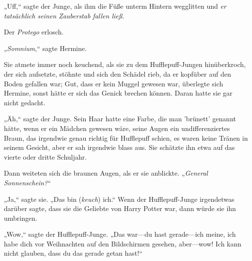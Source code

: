 „Uff,“ sagte der Junge, als ihm die Füße unterm Hintern wegglitten und \emph{er tatsächlich seinen Zauberstab fallen ließ}.

Der \emph{Protego} erlosch.

„\emph{Somnium},“ sagte Hermine.

Sie atmete immer noch keuchend, als sie zu dem Hufflepuff-Jungen hinüberkroch, der sich aufsetzte, stöhnte und sich den Schädel rieb, da er kopfüber auf den Boden gefallen war; Gut, dass er kein Muggel gewesen war, überlegte sich Hermine, sonst hätte er sich das Genick brechen können. Daran hatte sie gar nicht gedacht.

„Äh,“ sagte der Junge. Sein Haar hatte eine Farbe, die man 'brünett' genannt hätte, wenn er ein Mädchen gewesen wäre, seine Augen ein undifferenziertes Braun, das irgendwie genau richtig für Hufflepuff schien, es waren keine Tränen in seinem Gesicht, aber er sah irgendwie blass aus. Sie schätzte ihn etwa auf das vierte oder dritte Schuljahr.

Dann weiteten sich die braunen Augen, als er sie anblickte. „\emph{General Sonnenschein?}“

„Ja,“ sagte sie. „Das bin (\emph{keuch}) ich.“ Wenn der Hufflepuff-Junge irgendetwas darüber sagte, dass sie die Geliebte von Harry Potter war, dann würde sie ihn umbringen.

„Wow,“ sagte der Hufflepuff-Junge. „Das war—du hast gerade—ich meine, ich habe dich vor Weihnachten auf den Bildschirmen gesehen, aber—wow! Ich kann nicht glauben, dass du das gerade getan hast!“

